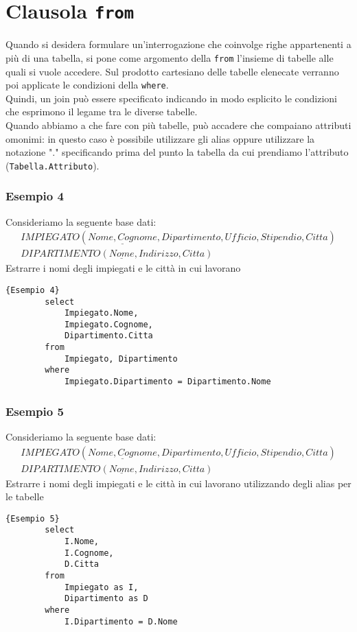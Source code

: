 \section{Clausola \texttt{from}}
Quando si desidera formulare un'interrogazione che coinvolge righe appartenenti a più di una tabella, si pone come argomento della \texttt{from} l'insieme di tabelle alle quali si vuole accedere. Sul prodotto cartesiano delle tabelle elenecate verranno poi applicate le condizioni della \texttt{where}.\\
Quindi, un join può essere specificato indicando in modo esplicito le condizioni che esprimono il legame tra le diverse tabelle.\\
Quando abbiamo a che fare con più tabelle, può accadere che compaiano attributi omonimi: in questo caso è possibile utilizzare gli alias oppure utilizzare la notazione "." specificando prima del punto la tabella da cui prendiamo l'attributo (\texttt{Tabella.Attributo}).

\subsubsection{Esempio 4}
Consideriamo la seguente base dati:
    \begin{equation}\begin{aligned}
        IMPIEGATO (\underline{Nome, Cognome}, Dipartimento, Ufficio, Stipendio, Citta)\\
        DIPARTIMENTO (\underline{Nome}, Indirizzo, Citta)
    \end{aligned}\end{equation}
Estrarre i nomi degli impiegati e le città in cui lavorano
    \begin{lstlisting}{Esempio 4}
        select 
            Impiegato.Nome,
            Impiegato.Cognome, 
            Dipartimento.Citta
        from 
            Impiegato, Dipartimento
        where 
            Impiegato.Dipartimento = Dipartimento.Nome
    \end{lstlisting}

\subsubsection{Esempio 5}
Consideriamo la seguente base dati:
    \begin{equation}\begin{aligned}
        IMPIEGATO (\underline{Nome, Cognome}, Dipartimento, Ufficio, Stipendio, Citta)\\
        DIPARTIMENTO (\underline{Nome}, Indirizzo, Citta)
    \end{aligned}\end{equation}
Estrarre i nomi degli impiegati e le città in cui lavorano utilizzando degli alias per le tabelle
    \begin{lstlisting}{Esempio 5}
        select 
            I.Nome, 
            I.Cognome, 
            D.Citta
        from 
            Impiegato as I, 
            Dipartimento as D
        where 
            I.Dipartimento = D.Nome
    \end{lstlisting}



